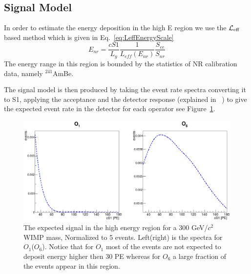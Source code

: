 \subsection{Signal Model}
\label{subsec:SignalModel}
In order to estimate the energy deposition in the high E region we use the $\mathcal{L}_{\mathrm{eff}}$ based method which is given in Eq.~\ref{eq:LeffEnergyScale}
\begin{equation}
\label{eq:LeffEnergyScale}
	E_{nr} = \frac{cS1}{L_y} \frac{1}{L_{eff}(E_{nr})} \frac{S_{ee}}{S_{nr}}
\end{equation}
The energy range in this region is bounded by the statistics of NR calibration data, namely $^{241}$AmBe.

The signal model is then produced by taking the event rate spectra converting it to S1, applying the acceptance and the detector response (explained in ~\cite{xe100_ana2012}) to give the expected event rate in the detector for each operator see Figure~\ref{fig:HighE}.
\begin{figure}[h!]
\begin{minipage}{1.\linewidth}
\centerline{\includegraphics[width=1.\linewidth]{Figures/SigHighO1O6.eps}}
\end{minipage}
\caption{The expected signal in the high energy region for a 300 GeV/$c^2$ WIMP mass, Normalized to 5 events. Left(right) is the spectra for $O_1$($O_6$). Notice that for $O_1$ most of the events are not expected to deposit energy higher then 30 PE whereas for $O_6$ a large fraction of the events appear in this region.}
\label{fig:HighE}
\end{figure} 




